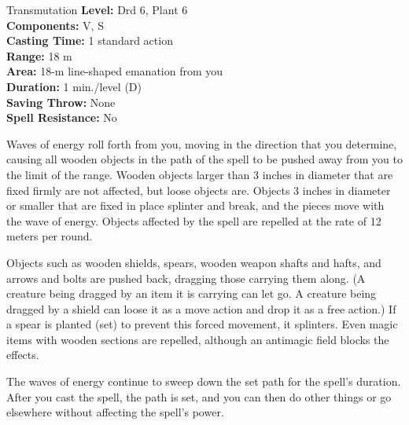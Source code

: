 {Transmutation}
{
	\textbf{Level:}
	Drd 6, Plant 6\\
	\textbf{Components:}
	V, S\\
	\textbf{Casting Time:}
	1 standard action\\
	\textbf{Range:}
	18 m\\
	\textbf{Area:}
	18-m line-shaped emanation from you\\
	\textbf{Duration:}
	1 min./level (D)\\
	\textbf{Saving Throw:}
	None\\
	\textbf{Spell Resistance:}
	No\\
}
{
	Waves of energy roll forth from you, moving in the direction that you determine, causing all wooden objects in the path of the spell to be pushed away from you to the limit of the range. Wooden objects larger than 3 inches in diameter that are fixed firmly are not affected, but loose objects are. Objects 3 inches in diameter or smaller that are fixed in place splinter and break, and the pieces move with the wave of energy. Objects affected by the spell are repelled at the rate of 12 meters per round.

	Objects such as wooden shields, spears, wooden weapon shafts and hafts, and arrows and bolts are pushed back, dragging those carrying them along. (A creature being dragged by an item it is carrying can let go. A creature being dragged by a shield can loose it as a move action and drop it as a free action.) If a spear is planted (set) to prevent this forced movement, it splinters. Even magic items with wooden sections are repelled, although an antimagic field blocks the effects.

	The waves of energy continue to sweep down the set path for the spell's duration. After you cast the spell, the path is set, and you can then do other things or go elsewhere without affecting the spell's power.

}
